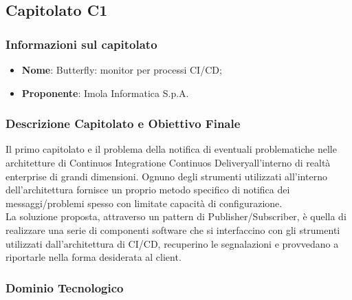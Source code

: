 \subsection{Capitolato C1}\label{C1}

\subsubsection{Informazioni sul capitolato}
\begin{itemize}
	\item \textbf{Nome}: Butterfly: monitor per processi CI/CD;
	\item \textbf{Proponente}: Imola Informatica S.p.A.
\end{itemize}

\subsubsection{Descrizione Capitolato e Obiettivo Finale}
Il primo capitolato e il problema della notifica di eventuali problematiche nelle architetture di Continuos Integration\glossario e Continuos Delivery\glossario all'interno di realtà enterprise di grandi dimensioni. Ognuno degli strumenti utilizzati all'interno dell'architettura fornisce un proprio metodo specifico di notifica dei messaggi/problemi spesso con limitate capacità di configurazione.\\
La soluzione proposta, attraverso un pattern di Publisher/Subscriber\glossario, è quella di realizzare una serie di componenti software che si interfaccino con gli strumenti utilizzati dall'architettura di CI/CD, recuperino  le segnalazioni e provvedano a riportarle nella forma desiderata al client.  
\subsubsection{Dominio Tecnologico}

